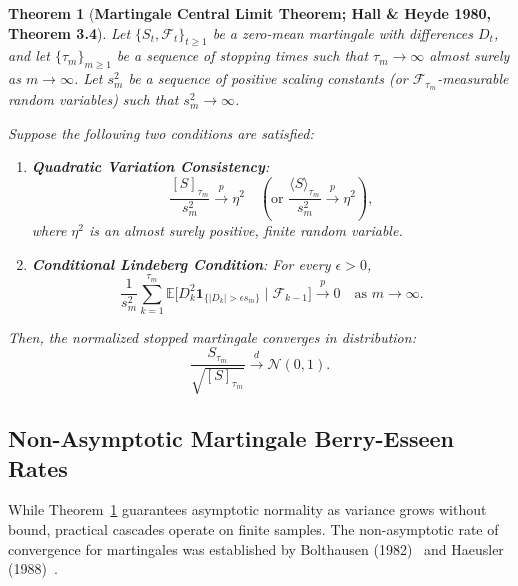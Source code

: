 \documentclass[11pt,a4paper]{article}
\newtheorem{theorem}{Theorem}
\begin{document}
\begin{theorem}[\textbf{Martingale Central Limit Theorem; Hall \& Heyde 1980, Theorem 3.4}]\label{thm:mclt}
Let $\{S_{t}, \mathcal{F}_{t}\}_{t \ge 1}$ be a zero-mean martingale with differences $D_t$, and let $\{\tau_m\}_{m \ge 1}$ be a sequence of stopping times such that $\tau_m \to \infty$ almost surely as $m \to \infty$. Let $s_m^2$ be a sequence of positive scaling constants (or $\mathcal{F}_{\tau_m}$-measurable random variables) such that $s_m^2 \to \infty$. 

Suppose the following two conditions are satisfied:
\begin{enumerate}[label=(\alph*)]
    \item \textbf{Quadratic Variation Consistency}:
    \begin{equation}\label{eq:cond_quad_var}
    \frac{[S]_{\tau_m}}{s_m^2} \xrightarrow{p} \eta^2 \quad (\text{or } \frac{\langle S \rangle_{\tau_m}}{s_m^2} \xrightarrow{p} \eta^2),
    \end{equation}
    where $\eta^2$ is an almost surely positive, finite random variable.
    \item \textbf{Conditional Lindeberg Condition}: For every $\epsilon > 0$,
    \begin{equation}\label{eq:cond_lindeberg}
    \frac{1}{s_m^2} \sum_{k=1}^{\tau_m} \mathbb{E}\Big[ D_k^2 \mathbf{1}_{\{|D_k| > \epsilon s_m\}} \;\Big|\; \mathcal{F}_{k-1} \Big] \xrightarrow{p} 0 \quad \text{as } m \to \infty.
    \end{equation}
\end{enumerate}
Then, the normalized stopped martingale converges in distribution:
\begin{equation}
\frac{S_{\tau_m}}{\sqrt{[S]_{\tau_m}}} \xrightarrow{d} \mathcal{N}(0, 1).
\end{equation}
\end{theorem}

\subsection{Non-Asymptotic Martingale Berry-Esseen Rates}
While Theorem~\ref{thm:mclt} guarantees asymptotic normality as variance grows without bound, practical cascades operate on finite samples. The non-asymptotic rate of convergence for martingales was established by Bolthausen (1982)~\cite{bolthausen1982} and Haeusler (1988)~\cite{haeusler1988}.
\end{document}
